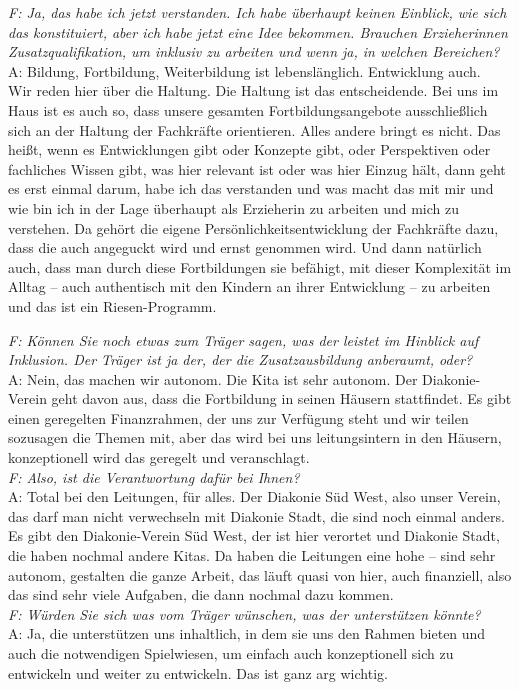 \begin{linenumbers*}
\emph{F: Ja, das habe ich jetzt verstanden. Ich habe überhaupt keinen Einblick, wie sich das konstituiert, aber ich habe jetzt eine Idee bekommen. Brauchen Erzieherinnen Zusatzqualifikation, um inklusiv zu arbeiten und wenn ja, in welchen Bereichen?}\\
A: Bildung, Fortbildung, Weiterbildung ist lebenslänglich. Entwicklung auch.\\ 
Wir reden hier über die Haltung. Die Haltung ist das entscheidende. Bei uns im Haus ist es auch so, dass unsere gesamten Fortbildungsangebote ausschließlich sich an der Haltung der Fachkräfte orientieren. Alles andere bringt es nicht. Das heißt, wenn es Entwicklungen gibt oder Konzepte gibt, oder Perspektiven oder fachliches Wissen gibt, was hier relevant ist oder was hier Einzug hält, dann geht es erst einmal darum, habe ich das verstanden und was macht das mit mir und wie bin ich in der Lage überhaupt als Erzieherin zu arbeiten und mich zu verstehen. Da gehört die eigene Persönlichkeitsentwicklung der Fachkräfte dazu, dass die auch angeguckt wird und ernst genommen wird. Und dann natürlich auch, dass man durch diese Fortbildungen sie befähigt, mit dieser Komplexität im Alltag -- auch authentisch mit den Kindern an ihrer Entwicklung -- zu arbeiten und das ist ein Riesen-Programm. 

\emph{F: Können Sie noch etwas zum Träger sagen, was der leistet im Hinblick auf Inklusion. Der Träger ist ja der, der die Zusatzausbildung anberaumt, oder?}\\
A: Nein, das machen wir autonom. Die Kita ist sehr autonom. Der Diakonie-Verein geht davon aus, dass die Fortbildung in seinen Häusern stattfindet. Es gibt einen geregelten Finanzrahmen, der uns zur Verfügung steht und wir teilen sozusagen die Themen mit, aber das wird bei uns leitungsintern in den Häusern, konzeptionell wird das geregelt und veranschlagt.\\
 \emph{F: Also, ist die Verantwortung dafür bei Ihnen?}\\
A: Total bei den Leitungen, für alles. Der Diakonie Süd West, also unser Verein, das darf man nicht verwechseln mit Diakonie Stadt, die sind noch einmal anders. Es gibt den Diakonie-Verein Süd West, der ist hier verortet und Diakonie Stadt, die haben nochmal andere Kitas. Da haben die Leitungen eine hohe -- sind sehr autonom, gestalten die ganze Arbeit, das läuft quasi von hier, auch finanziell, also das sind sehr viele Aufgaben, die dann nochmal dazu kommen.\\ 
\emph{F: Würden Sie sich was vom Träger wünschen, was der unterstützen könnte?}\\
A: Ja, die unterstützen uns inhaltlich, in dem sie uns den Rahmen bieten und auch die notwendigen Spielwiesen, um einfach auch konzeptionell sich zu entwickeln und weiter zu entwickeln. Das ist ganz arg wichtig.


\end{linenumbers*}
